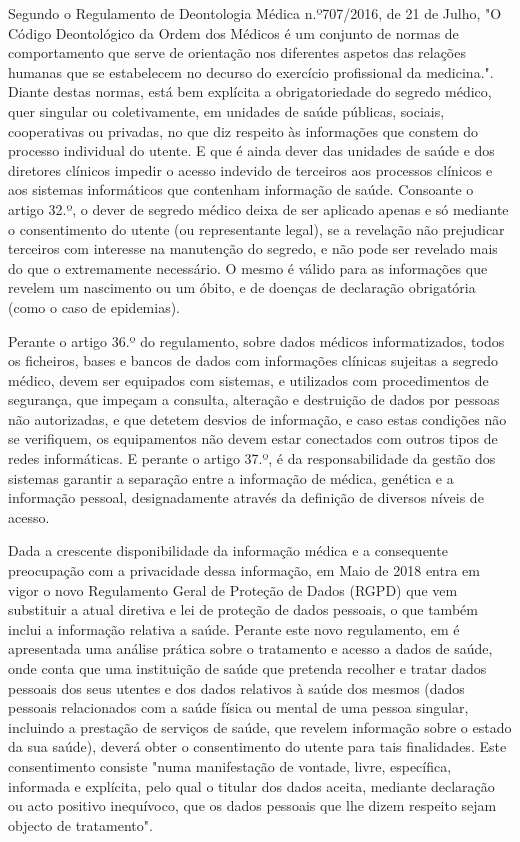 \documentclass[conference]{IEEEtran}
\begin{document}
Segundo o Regulamento de Deontologia Médica n.º707/2016, de 21 de Julho, "O Código Deontológico da Ordem dos Médicos é um conjunto de normas de comportamento que serve de orientação nos diferentes aspetos das relações humanas que se estabelecem no decurso do exercício profissional da medicina.". Diante destas normas, está bem explícita a obrigatoriedade do segredo médico, quer singular ou coletivamente, em unidades de saúde públicas, sociais, cooperativas ou privadas, no que diz respeito às informações que constem do processo individual do utente. E que é ainda dever das unidades de saúde e dos diretores clínicos impedir o acesso indevido de terceiros aos processos clínicos e aos sistemas informáticos que contenham informação de saúde.
Consoante o artigo 32.º, o dever de segredo médico deixa de ser aplicado apenas e só mediante o consentimento do utente (ou representante legal), se a revelação não prejudicar terceiros com interesse na manutenção do segredo, e não pode ser revelado mais do que o extremamente necessário. O mesmo é válido para as informações que revelem um nascimento ou um óbito, e de doenças de declaração obrigatória (como o caso de epidemias).

Perante o artigo 36.º do regulamento, sobre dados médicos informatizados, todos os ficheiros, bases e bancos de dados com informações clínicas sujeitas a segredo médico, devem ser equipados com sistemas, e utilizados com procedimentos de segurança, que impeçam a consulta, alteração e destruição de dados por pessoas não autorizadas, e que detetem desvios de informação, e caso estas condições não se verifiquem, os equipamentos não devem estar conectados com outros tipos de redes informáticas. E perante o artigo 37.º, é da responsabilidade da gestão dos sistemas garantir a separação entre a informação de médica, genética e a informação pessoal, designadamente através da definição de diversos níveis de acesso. 

Dada a crescente disponibilidade da informação médica e a consequente preocupação com a privacidade dessa informação, em Maio de 2018 entra em vigor o novo Regulamento Geral de Proteção de Dados (RGPD) que vem substituir a atual diretiva e lei de proteção de dados pessoais, o que também inclui a informação relativa a saúde. Perante este novo regulamento, em \cite{rgpd2018} é apresentada uma análise prática sobre o tratamento e acesso a dados de saúde, onde conta que uma instituição de saúde que pretenda recolher e tratar dados pessoais dos seus utentes e dos dados relativos à saúde dos mesmos (dados pessoais relacionados com a saúde física ou mental de uma pessoa singular, incluindo a prestação de serviços de saúde, que revelem informação sobre o estado da sua saúde), deverá obter o consentimento do utente para tais finalidades. Este consentimento consiste "numa manifestação de vontade, livre, específica, informada e explícita, pelo qual o titular dos dados aceita, mediante declaração ou acto positivo inequívoco, que os dados pessoais que lhe dizem respeito sejam objecto de tratamento".
\end{document}
